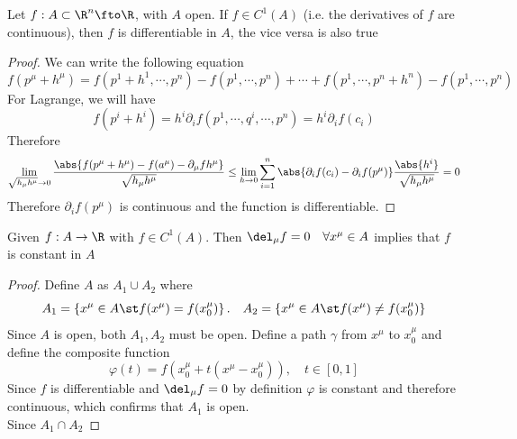 \documentclass[../mmf.tex]{subfiles}
\begin{document}
\begin{thm}
	Let $f:A\subset\R^n\fto\R$, with $A$ open. If $f\in C^1(A)$ (i.e. the derivatives of $f$ are continuous), then $f$ is differentiable in $A$, the vice versa is also true
\end{thm}
\begin{proof}
	We can write the following equation
	\begin{equation}
		f(p^\mu+h^\mu)=f(p^1+h^1,\cdots,p^n)-f(p^1,\cdots,p^n)+\cdots+f(p^1,\cdots,p^n+h^n)-f(p^1,\cdots,p^n)
		\label{eq:prepcontdiff}
	\end{equation}
	For Lagrange, we will have
	\begin{equation}
		f(p^i+h^i)=h^i\partial_i{f}(p^1,\cdots,q^i,\cdots,p^n)=h^i\partial_if(c_i)
		\label{eq:lagrange}
	\end{equation}
	Therefore
	\begin{equation}
		\lim_{\sqrt{h_\mu h^\mu}\to0}\frac{\abs{f(p^\mu+h^\mu)-f(a^\mu)-\partial_\mu fh^\mu}}{\sqrt{h_\mu h^\mu}}\le\lim_{h\to0}\sum_{i=1}^n\abs{\partial_if(c_i)-\partial_if(p^\mu)}\frac{\abs{h^i}}{\sqrt{h_\mu h^\mu}}=0
		\label{eq:continuousdiff}
	\end{equation}
	Therefore $\partial_i f(p^\mu)$ is continuous and the function is differentiable.
\end{proof}
\begin{thm}
	Given $f:A\to\R$ with $f\in C^1(A)$. Then $\del_\mu f=0\quad\forall x^\mu\in A$ implies that $f$ is constant in $A$
\end{thm}
\begin{proof}
	Define $A$ as $A_1\cup A_2$ where
	\begin{equation*}
		A_1=\left\{ x^\mu\in A\st f(x^\mu)=f(x^\mu_0) \right\}.\quad A_2=\left\{ x^\mu\in A\st f(x^\mu)\ne f(x^\mu_0) \right\}
	\end{equation*}
	Since $A$ is open, both $A_1,A_2$ must be open. Define a path $\gamma$ from $x^\mu$ to $x^\mu_0$ and define the composite function
	\begin{equation*}
		\varphi(t)=f\left( x^\mu_0+t(x^\mu-x^\mu_0) \right),\quad t\in[0,1]
	\end{equation*}
	Since $f$ is differentiable and $\del_\mu f=0$ by definition $\varphi$ is constant and therefore continuous, which confirms that $A_1$ is open.\\
	Since $A_1\cap A_2$
\end{proof}
\end{document}
